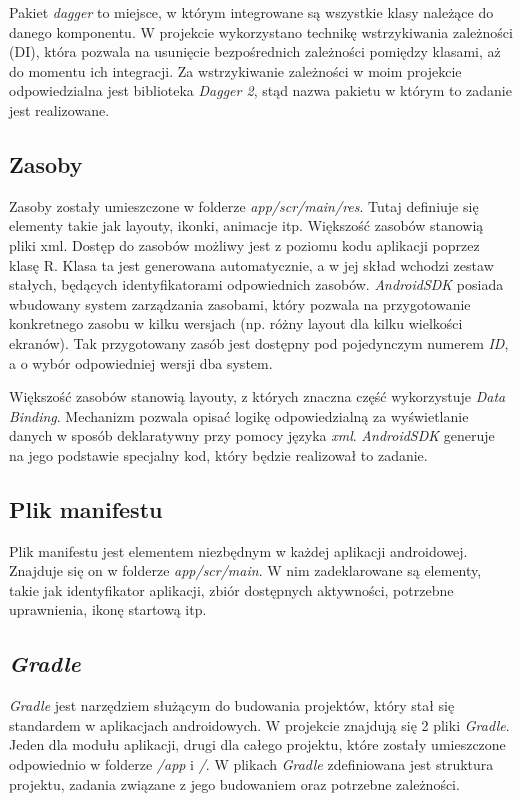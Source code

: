 \documentclass[openright]{xmgr}
\begin{document}
Pakiet \textit{dagger} to miejsce, w którym integrowane są wszystkie klasy należące do danego komponentu. W projekcie wykorzystano technikę wstrzykiwania zależności (DI), która pozwala na usunięcie bezpośrednich zależności pomiędzy klasami, aż do momentu ich integracji. Za wstrzykiwanie zależności w moim projekcie odpowiedzialna jest biblioteka \textit{Dagger 2}, stąd nazwa pakietu w którym to zadanie jest realizowane.

\subsection*{Zasoby}
Zasoby zostały umieszczone w folderze \textit{app/scr/main/res}. Tutaj definiuje się elementy takie jak layouty, ikonki, animacje itp. Większość zasobów stanowią pliki xml. Dostęp do zasobów możliwy jest z poziomu kodu aplikacji poprzez klasę R. Klasa ta jest generowana automatycznie, a w jej skład wchodzi zestaw stałych, będących identyfikatorami odpowiednich zasobów. \textit{AndroidSDK} posiada wbudowany system zarządzania zasobami, który pozwala na przygotowanie konkretnego zasobu w kilku wersjach (np. różny layout dla kilku wielkości ekranów). Tak przygotowany zasób jest dostępny pod pojedynczym numerem \textit{ID}, a o wybór odpowiedniej wersji dba system.

Większość zasobów stanowią layouty, z których znaczna część wykorzystuje \textit{Data Binding}. Mechanizm pozwala opisać logikę odpowiedzialną za wyświetlanie danych w sposób deklaratywny przy pomocy języka \textit{xml}. \textit{AndroidSDK} generuje na jego podstawie specjalny kod, który będzie realizował to zadanie. 

\subsection*{Plik manifestu}
Plik manifestu jest elementem niezbędnym w każdej aplikacji androidowej. Znajduje się on w folderze \textit{app/scr/main}. W nim zadeklarowane są elementy, takie jak identyfikator aplikacji, zbiór dostępnych aktywności, potrzebne uprawnienia, ikonę startową itp.

\subsection*{\textit{Gradle}}
\textit{Gradle} jest narzędziem służącym do budowania projektów, który stał się standardem w aplikacjach androidowych. W projekcie znajdują się 2 pliki \textit{Gradle}. Jeden dla modułu aplikacji, drugi dla całego projektu, które zostały umieszczone odpowiednio w folderze \textit{/app} i \textit{/}. W plikach \textit{Gradle} zdefiniowana jest struktura projektu, zadania związane z jego budowaniem oraz potrzebne zależności.
\end{document}
